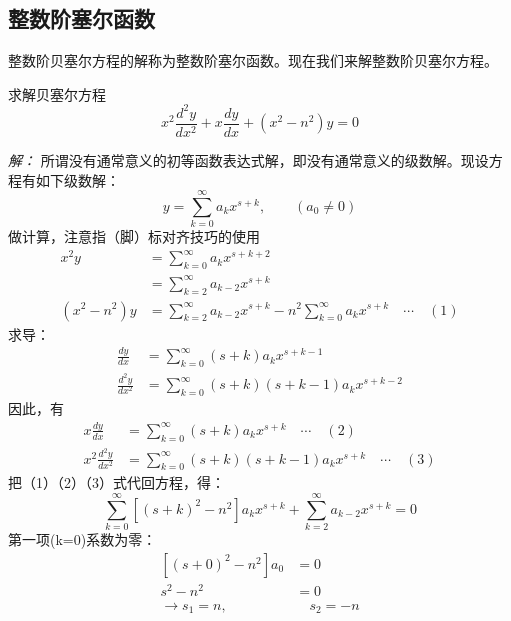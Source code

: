 \subsection{整数阶塞尔函数}
整数阶贝塞尔方程的解称为整数阶塞尔函数。现在我们来解整数阶贝塞尔方程。
\begin{example}
	求解贝塞尔方程
	\begin{equation*}
		x^2\frac{d^2y}{dx^2} + x\frac{dy}{dx} +(x^2 -n^2)y=0
	\end{equation*}		
\end{example}
\emph{解：}
	所谓没有通常意义的初等函数表达式解，即没有通常意义的级数解。现设方程有如下级数解：
	\begin{equation*}
		y=\sum\limits_{k=0}^{\infty} a_k x^{s+k},  \qquad (a_0 \not =0)
	\end{equation*}	
	做计算，注意指（脚）标对齐技巧的使用
	\[\begin{aligned}
		x^2 y &= \sum\limits_{k=0}^{\infty} a_k x^{s+k+2}  \\ 
		&= \sum\limits_{k=2}^{\infty}  a_{k-2} x^{s+k}  \\
		(x^2 -n^2)y &=  \sum\limits_{k=2}^{\infty}  a_{k-2} x^{s+k} - n^2 \sum\limits_{k=0}^{\infty} a_k x^{s+k} \quad \cdots \quad (1)
	\end{aligned}
	\] 
	求导：
	\begin{equation*}
	\begin{aligned}
		\frac{dy}{dx}&=\sum\limits_{k=0}^{\infty} (s+k) a_k x^{s+k-1} \\
		\frac{d^2y}{dx^2}&=\sum\limits_{k=0}^{\infty} (s+k) (s+k-1) a_k x^{s+k-2}
	\end{aligned}
	\end{equation*}
	因此，有
	\[\begin{aligned}
		x\frac{dy}{dx} &= \sum\limits_{k=0}^{\infty} (s+k) a_k x^{s+k} \quad \cdots \quad (2) \\ 
		x^2\frac{d^2y}{dx^2}&= \sum\limits_{k=0}^{\infty} (s+k) (s+k-1) a_k x^{s+k} \quad \cdots \quad (3)
	\end{aligned}
	\] 
	把（1）（2）（3）式代回方程，得：
	\begin{equation*}
		\sum\limits_{k=0}^{\infty} [(s+k) ^2 -n^2]  a_k x^{s+k} + \sum\limits_{k=2}^{\infty}  a_{k-2} x^{s+k} =0
	\end{equation*}	
	第一项(k=0)系数为零：
	\begin{equation*}
		\begin{aligned}
		[(s+0) ^2 -n^2] a_0 &= 0 \\
		s^2 -n^2 &= 0 \\
		\to  s_1=n, &\quad s_2=-n
	\end{aligned}
	\end{equation*}	
